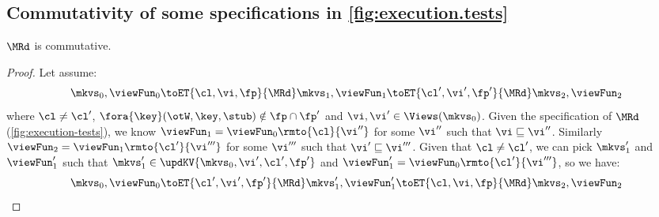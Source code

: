\subsection{Commutativity of some specifications in \cref{fig:execution.tests}}
\begin{lemma}
    \label{lem:mr-comm}
    \(\MRd\) is commutative.
\end{lemma}
\begin{proof}
    Let assume:
    \[
        \mkvs_0, \viewFun_0 \toET{\cl, \vi, \fp}{\MRd} \mkvs_1, \viewFun_1 \toET{\cl', \vi', \fp'}{\MRd} \mkvs_2, \viewFun_2 
    \]
    where \( \cl \neq \cl' \), \( \fora{ \key } (\otW, \key, \stub) \notin \fp \cap \fp' \) and \( \vi, \vi' \in \Views(\mkvs_0)\).
    Given the specification of \(\MRd\) (\cref{fig:execution-tests}), we know \( \viewFun_1 = \viewFun_0\rmto{\cl}{\vi''}\) for some \( \vi'' \) such that \( \vi \sqsubseteq \vi'' \).
    Similarly \( \viewFun_2 = \viewFun_1\rmto{\cl'}{\vi'''} \) for some \( \vi''' \) such that \(  \vi' \sqsubseteq \vi''' \). 
    Given that \( \cl \neq \cl' \), we can pick \( \mkvs'_1 \) and \( \viewFun'_1 \) such that \( \mkvs'_1 \in \updKV{\mkvs_0,\vi',\cl',\fp'} \) and \( \viewFun'_1 = \viewFun_0\rmto{\cl'}{\vi'''} \), so we have:
    \[
        \mkvs_0, \viewFun_0 \toET{\cl', \vi', \fp'}{\MRd} \mkvs'_1, \viewFun'_1 \toET{\cl, \vi, \fp}{\MRd} \mkvs_2, \viewFun_2 
    \]
\end{proof}                                                                                    

